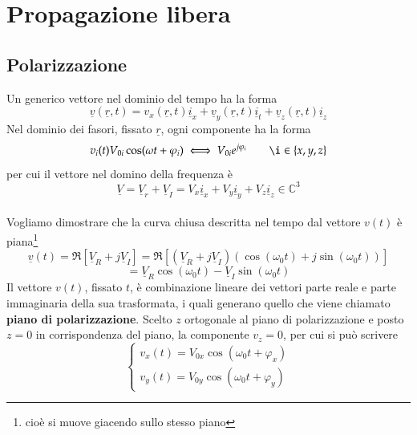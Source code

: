 \documentclass{book}
\begin{document}
\chapter{Propagazione libera}
    \section{Polarizzazione}
        Un generico vettore nel dominio del tempo ha la forma
        \begin{equation}
            \underline{v}(\underline{r}, t) = v_{x} (\underline{r},t)\underline{i}_{x}+\underline{v}_{y}(\underline{r},t)\underline{i}_{t}+\underline{v}_{z}(\underline{r}, t) \underline{i}_{z}
        \end{equation}
        Nel dominio dei fasori, fissato $\underline{r}$, ogni componente ha la forma 
        \begin{equation}
            v_{i}(t) V_{0i}\cos(\omega t + \varphi_{i}) \iff V_{0i}e^{j \varphi_{i}} \qquad \i \in \{x, y, z\}
        \end{equation}
        per cui il vettore nel domino della frequenza è 
        \begin{equation}
            \underline{V} = \underline{V}_{r}+\underline{V}_{I} = V_{x}\underline{i}_{x}+V_{y}\underline{i}_{y}+V_{z}\underline{i}_{z} \in \mathbb{C} ^{3}
        \end{equation} \\
        Vogliamo dimostrare che la curva chiusa descritta nel tempo dal vettore $v(t)$ è piana\footnote{cioè si muove giacendo sullo stesso piano}
        \begin{equation}
            \underline{v}(t) = \Re[\underline{V}_{R}+j\underline{V}_{I}] = \Re[(\underline{V}_{R}+j\underline{V}_{I})(\cos(\omega_{0}t)+j\sin(\omega_{0}t))]
        \end{equation}
        \begin{equation}
            = \underline{V}_{R}\cos(\omega_{0}t)-\underline{V}_{I}\sin(\omega_{0}t)
        \end{equation}
        Il vettore $v(t)$, fissato $t$, è combinazione lineare dei vettori parte reale e parte immaginaria della sua trasformata, i quali generano
        quello che viene chiamato \textbf{piano di polarizzazione}. Scelto $z$ ortogonale al piano di polarizzazione e posto $z=0$ in corrispondenza del piano,
        la componente $v_{z}=0$, per cui si può scrivere 
        \begin{equation}
            \begin{cases}
            v_{x}(t) = V_{0x}\cos(\omega_{0}t+\varphi_{x}) \\
            v_{y}(t)=V_{0y}\cos(\omega_{0}t+\varphi_{y})
            \end{cases}
        \end{equation}
\end{document}
